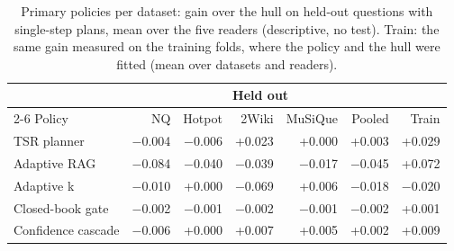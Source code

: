 \begin{table}[t]
\centering\footnotesize
\setlength{\tabcolsep}{2.6pt}
\caption{Primary policies per dataset: gain over the hull on held-out questions with single-step plans, mean over the five readers (descriptive, no test). Train: the same gain measured on the training folds, where the policy and the hull were fitted (mean over datasets and readers).}
\label{tab:p_datasets}
\begin{tabular*}{\linewidth}{@{\extracolsep{\fill}}lrrrrrr@{}}
\toprule
 & \multicolumn{5}{c}{Held out} & \\
\cmidrule(lr){2-6}
Policy & NQ & Hotpot & 2Wiki & MuSiQue & Pooled & Train \\
\midrule
TSR planner & $-$0.004 & $-$0.006 & +0.023 & +0.000 & +0.003 & +0.029 \\
Adaptive RAG & $-$0.084 & $-$0.040 & $-$0.039 & $-$0.017 & $-$0.045 & +0.072 \\
Adaptive k & $-$0.010 & +0.000 & $-$0.069 & +0.006 & $-$0.018 & $-$0.020 \\
Closed-book gate & $-$0.002 & $-$0.001 & $-$0.002 & $-$0.001 & $-$0.002 & +0.001 \\
Confidence cascade & $-$0.006 & +0.000 & +0.007 & +0.005 & +0.002 & +0.009 \\
\bottomrule
\end{tabular*}
\end{table}
